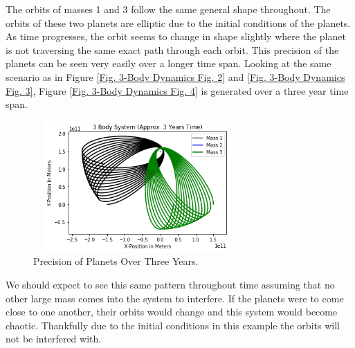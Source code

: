 \documentclass[twocolumn]{article}
\begin{document}
\par \noindent
The orbits of masses 1 and 3 follow the same general shape throughout. The orbits of these two planets are elliptic due to the initial conditions of the planets. As time progresses, the orbit seems to change in shape slightly where the planet is not traversing the same exact path through each orbit.  This precision of the planets can be seen very easily over a longer time span. Looking at the same scenario as in Figure \ref{Fig. 3-Body Dynamics Fig. 2} and \ref{Fig. 3-Body Dynamics Fig. 3}, Figure \ref{Fig. 3-Body Dynamics Fig. 4} is generated over a three year time span.
\newpage
\begin{figure}[h]
    \centering
    \includegraphics[width=8cm, height=5cm]{Figures/3-Body Dynamics (5).png}
    \caption{Precision of Planets Over Three Years.}
    \label{Fig. 3-Body Dynamics Fig. 5}
\end{figure}
\par \noindent
We should expect to see this same pattern throughout time assuming that no other large mass comes into the system to interfere. If the planets were to come close to one another, their orbits would change and this system would become chaotic. Thankfully due to the initial conditions in this example the orbits will not be interfered with.
\end{document}
